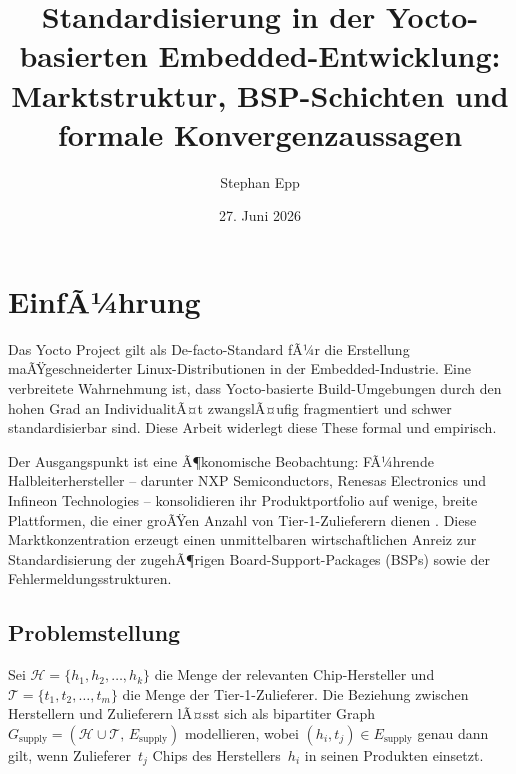 ﻿\documentclass[a4paper,12pt]{article}
\title{Standardisierung in der Yocto-basierten Embedded-Entwicklung:\\
Marktstruktur, BSP-Schichten und formale Konvergenzaussagen}
\author{Stephan Epp}
\date{27. Juni 2026}
\theoremstyle{definition}
\begin{document}
\sloppy

\maketitle

\tableofcontents
\newpage

\section{EinfÃ¼hrung}

Das Yocto Project \cite{yocto2024} gilt als De-facto-Standard fÃ¼r die Erstellung maÃŸgeschneiderter
Linux-Distributionen in der Embedded-Industrie. Eine verbreitete Wahrnehmung ist,
dass Yocto-basierte Build-Umgebungen durch den hohen Grad an IndividualitÃ¤t zwangslÃ¤ufig
fragmentiert und schwer standardisierbar sind. Diese Arbeit widerlegt diese These formal und empirisch.

Der Ausgangspunkt ist eine Ã¶konomische Beobachtung: FÃ¼hrende Halbleiterhersteller --
darunter NXP Semiconductors, Renesas Electronics und Infineon Technologies -- konsolidieren
ihr Produktportfolio auf wenige, breite Plattformen, die einer groÃŸen Anzahl von
Tier-1-Zulieferern dienen \cite{nxp2023, renesas2023, infineon2023}. Diese Marktkonzentration
erzeugt einen unmittelbaren wirtschaftlichen Anreiz zur Standardisierung der zugehÃ¶rigen
Board-Support-Packages (BSPs) sowie der Fehlermeldungsstrukturen.

\subsection{Problemstellung}

Sei $\mathcal{H} = \{h_1, h_2, \ldots, h_k\}$ die Menge der relevanten Chip-Hersteller
und $\mathcal{T} = \{t_1, t_2, \ldots, t_m\}$ die Menge der Tier-1-Zulieferer.
Die Beziehung zwischen Herstellern und Zulieferern lÃ¤sst sich als bipartiter Graph
$G_{\mathrm{supply}} = (\mathcal{H} \cup \mathcal{T},\, E_{\mathrm{supply}})$ modellieren,
wobei $(h_i, t_j) \in E_{\mathrm{supply}}$ genau dann gilt, wenn Zulieferer~$t_j$
Chips des Herstellers~$h_i$ in seinen Produkten einsetzt.
\end{document}
